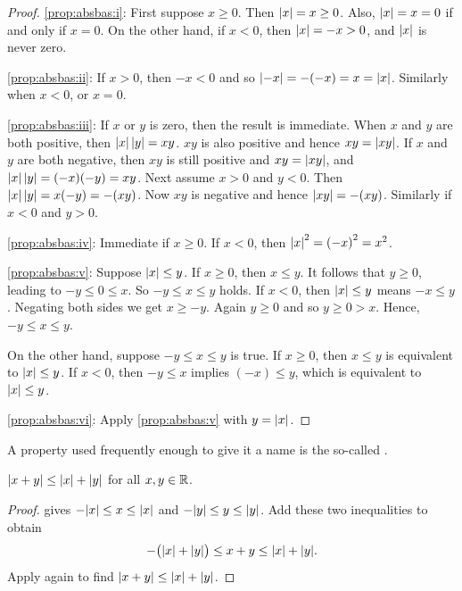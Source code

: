 \begin{proof}
\ref{prop:absbas:i}:
First suppose $x \geq 0$.
Then $\left\lvert {x} \right\rvert = x \geq 0$.  Also, $\left\lvert {x} \right\rvert = x = 0$ if and only
if $x=0$.
On the other hand, if $x < 0$, then $\left\lvert {x} \right\rvert = -x > 0$, and $\left\lvert {x} \right\rvert$ is never zero.

\medskip

\ref{prop:absbas:ii}: If $x > 0$, then $-x < 0$ and so $\left\lvert {-x} \right\rvert = -(-x) = x =
\left\lvert {x} \right\rvert$.  Similarly when $x < 0$, or $x = 0$.

\medskip

\ref{prop:absbas:iii}:
If $x$ or $y$ is zero, then the result is immediate.  When $x$ and
$y$ are both positive, then $\left\lvert {x} \right\rvert\left\lvert {y} \right\rvert = xy$.  $xy$ is also positive
and hence $xy = \left\lvert {xy} \right\rvert$.  If $x$ and $y$ are both negative,
then $xy$ is still positive and $xy = \left\lvert {xy} \right\rvert$, and
$\left\lvert {x} \right\rvert\left\lvert {y} \right\rvert = (-x)(-y) = xy$.
Next assume
$x > 0$ and $y < 0$.  Then $\left\lvert {x} \right\rvert\left\lvert {y} \right\rvert = x(-y) = -(xy)$.  Now
$xy$ is negative and hence $\left\lvert {xy} \right\rvert = -(xy)$.  Similarly if
$x < 0$ and $y > 0$.

\medskip

\ref{prop:absbas:iv}:
Immediate if $x \geq 0$.  If $x < 0$, then $\left\lvert {x} \right\rvert^2 = {(-x)}^2 =
x^2$.

\medskip

\ref{prop:absbas:v}:  Suppose $\left\lvert {x} \right\rvert \leq y$.  If $x \geq 0$,
then $x \leq y$.  It follows that $y \geq 0$, leading to $-y \leq 0 \leq x$.  So $-y \leq x \leq y$
holds.  If $x < 0$, then $\left\lvert {x} \right\rvert \leq y$ means $-x \leq y$.  Negating both
sides we get $x \geq -y$.  Again $y \geq 0$ and so $y \geq 0 > x$.
Hence, $-y \leq x \leq y$.

On the other hand, suppose 
$-y \leq x \leq y$ is true.  If $x \geq 0$, then $x \leq y$ is equivalent
to $\left\lvert {x} \right\rvert \leq y$.  If $x < 0$, then $-y \leq x$ implies
$(-x) \leq y$, which is equivalent to $\left\lvert {x} \right\rvert \leq y$.

\medskip

\ref{prop:absbas:vi}:  Apply \ref{prop:absbas:v} with $y = \left\lvert {x} \right\rvert$.
\end{proof}

A property used frequently enough to give it a name is the so-called
\emph{}.

\begin{prop}
$\lvert {x+y} \rvert \leq \lvert {x} \rvert+\lvert {y} \rvert$
for all $x, y \in {\mathbb{R}}$.
\end{prop}

\begin{proof}
 gives
$- \lvert {x} \rvert \leq x \leq \lvert {x} \rvert$ and
$- \lvert {y} \rvert \leq y \leq \lvert {y} \rvert$.  Add these two inequalities to obtain
\begin{equation*}
- \bigl(\lvert {x} \rvert+\lvert {y} \rvert\bigr) \leq x+y \leq \lvert {x} \rvert+ \lvert {y} \rvert .
\end{equation*}
Apply  again to find
$\lvert {x+y} \rvert \leq \lvert {x} \rvert+\lvert {y} \rvert$.
\end{proof}

